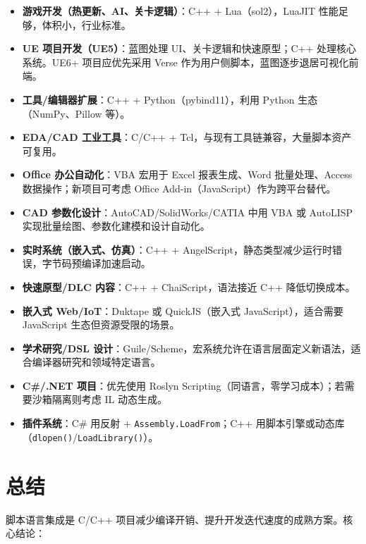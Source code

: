 \documentclass[12pt,a4paper,fontset=fandol]{ctexbook}
\newenvironment{bestpractice}[1][]{%
  \begin{tcolorbox}[enhanced,breakable,
    colback=purple!5!white,colframe=purple!60!black,
    boxed title style={colback=purple!60!black},
    attach boxed title to top left={yshift=-2mm,xshift=2mm},
    arc=2mm,boxrule=0.8mm,
    title={最佳实践},#1]}%
  {\end{tcolorbox}}
\newcommand{\Fn}[1]{\texttt{#1()}}
\newcommand{\Tp}[1]{\texttt{#1}}
\begin{document}
\begin{bestpractice}[title={选型建议}]
\begin{itemize}
  \item \textbf{游戏开发（热更新、AI、关卡逻辑）}：C++ + Lua（sol2），LuaJIT 性能足够，体积小，行业标准。
  \item \textbf{UE 项目开发（UE5）}：蓝图处理 UI、关卡逻辑和快速原型；C++ 处理核心系统。UE6+ 项目应优先采用 Verse 作为用户侧脚本，蓝图逐步退居可视化前端。
  \item \textbf{工具/编辑器扩展}：C++ + Python（pybind11），利用 Python 生态（NumPy、Pillow 等）。
  \item \textbf{EDA/CAD 工业工具}：C/C++ + Tcl，与现有工具链兼容，大量脚本资产可复用。
  \item \textbf{Office 办公自动化}：VBA 宏用于 Excel 报表生成、Word 批量处理、Access 数据操作；新项目可考虑 Office Add-in（JavaScript）作为跨平台替代。
  \item \textbf{CAD 参数化设计}：AutoCAD/SolidWorks/CATIA 中用 VBA 或 AutoLISP 实现批量绘图、参数化建模和设计自动化。
  \item \textbf{实时系统（嵌入式、仿真）}：C++ + AngelScript，静态类型减少运行时错误，字节码预编译加速启动。
  \item \textbf{快速原型/DLC 内容}：C++ + ChaiScript，语法接近 C++ 降低切换成本。
  \item \textbf{嵌入式 Web/IoT}：Duktape 或 QuickJS（嵌入式 JavaScript），适合需要 JavaScript 生态但资源受限的场景。
  \item \textbf{学术研究/DSL 设计}：Guile/Scheme，宏系统允许在语言层面定义新语法，适合编译器研究和领域特定语言。
  \item \textbf{C\#/.NET 项目}：优先使用 Roslyn Scripting（同语言，零学习成本）；若需要沙箱隔离则考虑 IL 动态生成。
  \item \textbf{插件系统}：C\# 用反射 + \Tp{Assembly.LoadFrom}；C++ 用脚本引擎或动态库（\Fn{dlopen}/\allowbreak{}\Fn{LoadLibrary}）。
\end{itemize}
\end{bestpractice}


\chapter{总结}\label{ch:conclusion}

脚本语言集成是 C/C++ 项目减少编译开销、提升开发迭代速度的成熟方案。核心结论：
\end{document}
